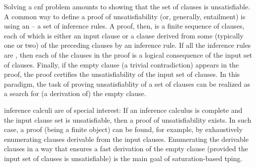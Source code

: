 Solving a \gls{cnf} problem amounts to showing that the set of clauses is unsatisfiable.
A common way to define a proof of unsatisfiability (or, generally, entailment) is using an  -- a set of inference rules.
A proof, then, is a finite sequence of clauses,
each of which is either an input clause or a clause derived from some (typically one or two) of the preceding clauses by an inference rule.
If all the inference rules are ,
then each of the clauses in the proof is a logical consequence of the input set of clauses.
Finally, if the empty clause (a trivial contradiction) appears in the proof,
the proof certifies the unsatisfiability of the input set of clauses.
In this paradigm, the task of proving unsatisfiablity of a set of clauses can be realized as a search for (a derivation of) the empty clause.

 inference calculi are of special interest:
If an inference calculus is complete and the input clause set is unsatisfiable,
then a proof of unsatisfiability exists.
In such case, a proof (being a finite object) can be found, for example, by
exhaustively
enumerating clauses derivable from the input clauses.
Enumerating the derivable clauses in a way that ensures a fast derivation of the empty clause (provided the input set of clauses is unsatisfiable) is the main goal of saturation-based \gls{tping}.




